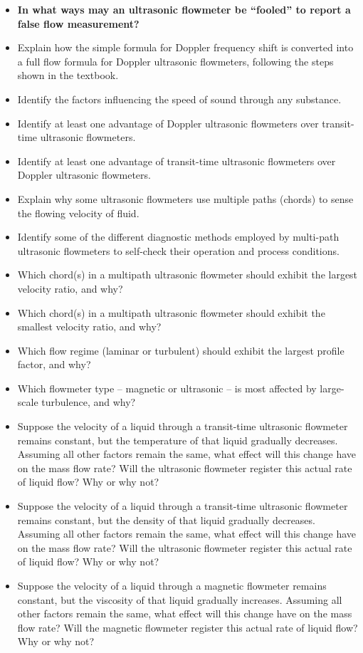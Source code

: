\begin{itemize}
\item{} {\bf In what ways may an ultrasonic flowmeter be ``fooled'' to report a false flow measurement?}
\item{} Explain how the simple formula for Doppler frequency shift is converted into a full flow formula for Doppler ultrasonic flowmeters, following the steps shown in the textbook.
\item{} Identify the factors influencing the speed of sound through any substance.
\item{} Identify at least one advantage of Doppler ultrasonic flowmeters over transit-time ultrasonic flowmeters.
\item{} Identify at least one advantage of transit-time ultrasonic flowmeters over Doppler ultrasonic flowmeters.
\item{} Explain why some ultrasonic flowmeters use multiple paths (chords) to sense the flowing velocity of fluid.
\item{} Identify some of the different diagnostic methods employed by multi-path ultrasonic flowmeters to self-check their operation and process conditions.
\item{} Which chord(s) in a multipath ultrasonic flowmeter should exhibit the largest velocity ratio, and why?
\item{} Which chord(s) in a multipath ultrasonic flowmeter should exhibit the smallest velocity ratio, and why?
\item{} Which flow regime (laminar or turbulent) should exhibit the largest profile factor, and why?
\item{} Which flowmeter type -- magnetic or ultrasonic -- is most affected by large-scale turbulence, and why?
\item{} Suppose the velocity of a liquid through a transit-time ultrasonic flowmeter remains constant, but the temperature of that liquid gradually decreases.  Assuming all other factors remain the same, what effect will this change have on the mass flow rate?  Will the ultrasonic flowmeter register this actual rate of liquid flow?  Why or why not?
\item{} Suppose the velocity of a liquid through a transit-time ultrasonic flowmeter remains constant, but the density of that liquid gradually decreases.  Assuming all other factors remain the same, what effect will this change have on the mass flow rate?  Will the ultrasonic flowmeter register this actual rate of liquid flow?  Why or why not?
\item{} Suppose the velocity of a liquid through a magnetic flowmeter remains constant, but the viscosity of that liquid gradually increases.  Assuming all other factors remain the same, what effect will this change have on the mass flow rate?  Will the magnetic flowmeter register this actual rate of liquid flow?  Why or why not?

\end{itemize}
